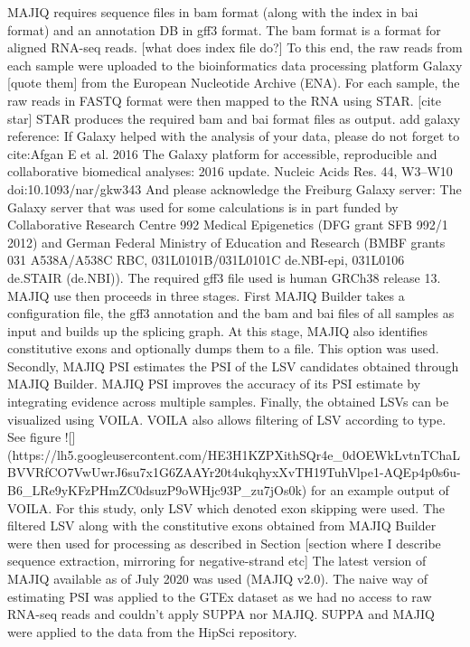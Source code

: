 MAJIQ requires sequence files in bam format (along with the index in bai format) and an annotation DB in gff3 format. The bam format is a format for aligned RNA-seq reads. [what does index file do?]
To this end, the raw reads from each sample were uploaded to the bioinformatics data processing platform Galaxy [quote them] from the European Nucleotide Archive (ENA). For each sample, the raw reads in FASTQ format were then mapped to the RNA using STAR. [cite star] STAR produces the required bam and bai format files as output.
add galaxy reference:
If Galaxy helped with the analysis of your data, please do not forget to cite:Afgan E et al. 2016 The Galaxy platform for accessible, reproducible and collaborative biomedical analyses: 2016 update.
Nucleic Acids Res. 44, W3–W10
doi:10.1093/nar/gkw343
And please acknowledge the Freiburg Galaxy server: The Galaxy server that was used for some calculations is in part funded by Collaborative Research Centre 992 Medical Epigenetics (DFG grant SFB 992/1 2012) and German Federal Ministry of Education and Research (BMBF grants 031 A538A/A538C RBC, 031L0101B/031L0101C de.NBI-epi, 031L0106 de.STAIR (de.NBI)).
The required gff3 file used is human GRCh38 release 13.
MAJIQ use then proceeds in three stages. First MAJIQ Builder takes a configuration file, the gff3 annotation and the bam and bai files of all samples as input and builds up the splicing graph. At this stage, MAJIQ also identifies constitutive exons and optionally dumps them to a file. This option was used.
Secondly, MAJIQ PSI estimates the PSI of the LSV candidates obtained through MAJIQ Builder. MAJIQ PSI improves the accuracy of its PSI estimate by integrating evidence across multiple samples.
Finally, the obtained LSVs can be visualized using VOILA. VOILA also allows filtering of LSV according to type. See figure ![](https://lh5.googleusercontent.com/HE3H1KZPXithSQr4e_0dOEWkLvtnTChaLBVVRfCO7VwUwrJ6su7x1G6ZAAYr20t4ukqhyxXvTH19TuhVlpe1-AQEp4p0s6u-B6_LRe9yKFzPHmZC0dsuzP9oWHjc93P_zu7jOs0k) for an example output of VOILA. For this study, only LSV which denoted exon skipping were used. The filtered LSV along with the constitutive exons obtained from MAJIQ Builder were then used for processing as described in Section [section where I describe sequence extraction, mirroring for negative-strand etc]
The latest version of MAJIQ available as of July 2020 was used (MAJIQ v2.0).
The naive way of estimating PSI was applied to the GTEx dataset as we had no access to raw RNA-seq reads and couldn't apply SUPPA nor MAJIQ. SUPPA and MAJIQ were applied to the data from the HipSci repository.
